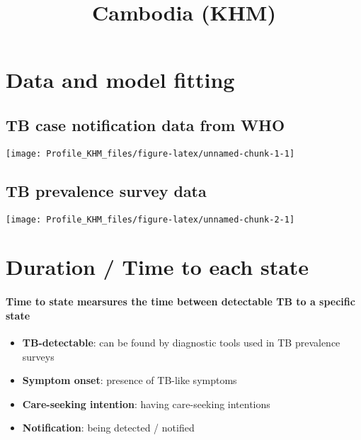 \documentclass[
]{article}
\title{Cambodia (KHM)}
\author{}
\date{\vspace{-2.5em}}
\providecommand{\tightlist}{%
  \setlength{\itemsep}{0pt}\setlength{\parskip}{0pt}}
\begin{document}
\maketitle

{
\setcounter{tocdepth}{2}
\tableofcontents
}
\hypertarget{data-and-model-fitting}{%
\section{Data and model fitting}\label{data-and-model-fitting}}

\hypertarget{tb-case-notification-data-from-who}{%
\subsection{TB case notification data from
WHO}\label{tb-case-notification-data-from-who}}

\texttt{[image: Profile\_KHM\_files/figure-latex/unnamed-chunk-1-1]}

\hypertarget{tb-prevalence-survey-data}{%
\subsection{TB prevalence survey data}\label{tb-prevalence-survey-data}}

\texttt{[image: Profile\_KHM\_files/figure-latex/unnamed-chunk-2-1]}

\hypertarget{duration-time-to-each-state}{%
\section{Duration / Time to each
state}\label{duration-time-to-each-state}}

\hypertarget{time-to-state-mearsures-the-time-between-detectable-tb-to-a-specific-state}{%
\paragraph{Time to state mearsures the time between detectable TB to a
specific
state}\label{time-to-state-mearsures-the-time-between-detectable-tb-to-a-specific-state}}

\begin{itemize}
\tightlist
\item
  \textbf{TB-detectable}: can be found by diagnostic tools used in TB
  prevalence surveys
\item
  \textbf{Symptom onset}: presence of TB-like symptoms
\item
  \textbf{Care-seeking intention}: having care-seeking intentions
\item
  \textbf{Notification}: being detected / notified
\end{itemize}
\end{document}
